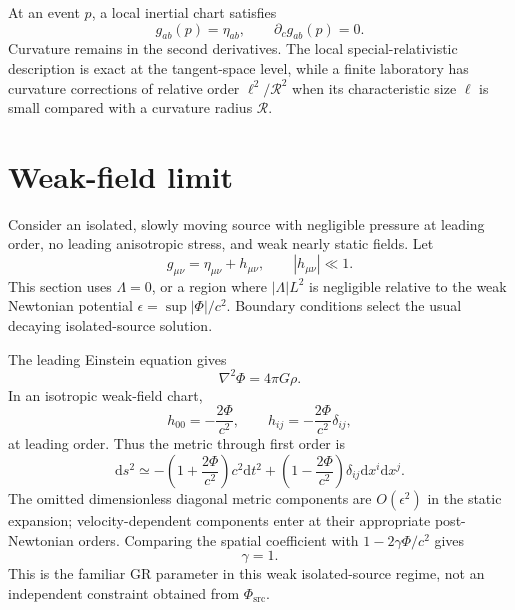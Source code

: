 \documentclass[11pt,oneside]{report}
\newcommand{\PhiSrc}{\Phi_{\mathrm{src}}}
\newcommand{\Ph}{\Phi}
\newcommand{\dd}{\mathrm d}
\theoremstyle{remark}
\numberwithin{definition}{chapter}
\numberwithin{proposition}{chapter}
\numberwithin{remark}{chapter}
\begin{document}
At an event $p$, a local inertial chart satisfies
\begin{equation}
g_{ab}(p)=\eta_{ab},\qquad \partial_cg_{ab}(p)=0.
\label{dynamics:eq:localinertial}
\end{equation}
Curvature remains in the second derivatives. The local special-relativistic description is exact at the tangent-space level, while a finite laboratory has curvature corrections of relative order $\ell^2/\mathcal R^2$ when its characteristic size $\ell$ is small compared with a curvature radius $\mathcal R$.

\section{Weak-field limit}
Consider an isolated, slowly moving source with negligible pressure at leading order, no leading anisotropic stress, and weak nearly static fields. Let
\begin{equation}
g_{\mu\nu}=\eta_{\mu\nu}+h_{\mu\nu},\qquad |h_{\mu\nu}|\ll1.
\label{dynamics:eq:linearizedmetric}
\end{equation}
This section uses $\Lambda=0$, or a region where $|\Lambda|L^2$ is negligible relative to the weak Newtonian potential $\epsilon=\sup|\Ph|/c^2$. Boundary conditions select the usual decaying isolated-source solution.

The leading Einstein equation gives
\begin{equation}
\nabla^2\Ph=4\pi G\rho.
\label{dynamics:eq:poisson}
\end{equation}
In an isotropic weak-field chart,
\begin{equation}
h_{00}=-\frac{2\Ph}{c^2},\qquad h_{ij}=-\frac{2\Ph}{c^2}\delta_{ij},
\label{dynamics:eq:hweakfield}
\end{equation}
at leading order. Thus the metric through first order is
\begin{equation}
\dd s^2\simeq-\left(1+\frac{2\Ph}{c^2}\right)c^2\dd t^2+
\left(1-\frac{2\Ph}{c^2}\right)\delta_{ij}\dd x^i\dd x^j.
\label{dynamics:eq:weakfield}
\end{equation}
The omitted dimensionless diagonal metric components are $O(\epsilon^2)$ in the static expansion; velocity-dependent components enter at their appropriate post-Newtonian orders. Comparing the spatial coefficient with $1-2\gamma\Ph/c^2$ gives
\begin{equation}
\gamma=1.
\label{dynamics:eq:gamma}
\end{equation}
This is the familiar GR parameter in this weak isolated-source regime, not an independent constraint obtained from $\PhiSrc$.
\end{document}
